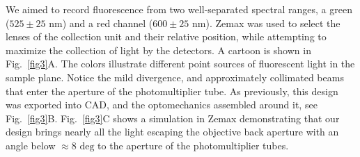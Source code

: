 \documentclass[10pt,letterpaper]{article}
\begin{document}
We aimed to record fluorescence from two well-separated spectral ranges, a green ($525\pm25\text{ nm}$) and a red channel ($600\pm25\text{ nm}$).  Zemax was used to select the lenses of the collection unit and their relative position, while attempting to maximize the collection of light by the detectors.  A cartoon is shown in Fig.~\ref{fig3}A. The colors illustrate different point sources of fluorescent light in the sample plane. Notice the mild divergence, and approximately collimated beams that enter the aperture of the photomultiplier tube. As previously, this design was exported into CAD, and the optomechanics assembled around it, see Fig.~\ref{fig3}B. Fig.~\ref{fig3}C shows a simulation in Zemax demonstrating that our design brings nearly all the light escaping the objective back aperture with an angle below  $\approx8\text{ deg}$ to the aperture of the photomultiplier tubes. 
\end{document}
